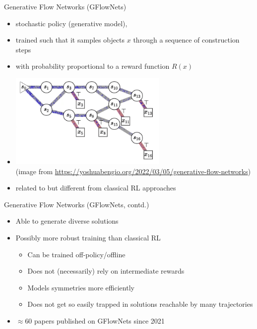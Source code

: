 \documentclass[aspectratio=1610]{beamer}
\newcommand{\important}[1]{{\color{green!60!black}#1}}
\renewcommand{\footnotesize}{\scriptsize}
\begin{document}
\begin{frame}{Generative Flow Networks (GFlowNets)}

	\citet{bengio-21a}
	
	\begin{itemize}
		\item \important{stochastic policy} (generative model),
		\item trained such that it samples objects $x$ through a sequence of construction steps
		\item with probability \important{proportional to a reward function $R(x)$}
		\item 

	\includegraphics[width=0.6\textwidth]{graphics/gflownet_anim.png}\\
	{\footnotesize (image from \url{https://yoshuabengio.org/2022/03/05/generative-flow-networks})}

	\item related to but different from classical RL approaches
	\end{itemize}
\end{frame}


\begin{frame}{Generative Flow Networks (GFlowNets, contd.)}
	\begin{itemize}
		\item Able to generate \important{diverse} solutions
		\item Possibly more robust training than classical RL
		\begin{itemize}
			\item Can be trained off-policy/offline
			\item Does not (necessarily) rely on intermediate rewards
			\item Models symmetries more efficiently
			\item Does not get so easily trapped in solutions reachable by many trajectories
		\end{itemize}
		\item $\approx 60$ papers published on GFlowNets since 2021
	\end{itemize}
\end{frame}
\end{document}
